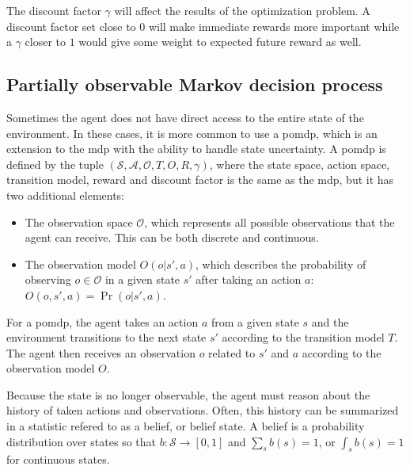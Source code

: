 The discount factor $\gamma$ will affect the results of the optimization problem. A discount factor set close to $0$ will make immediate rewards more important while a $\gamma$ closer to $1$ would give some weight to expected future reward as well. 

\subsection{Partially observable Markov decision process}\label{section:pomdp}
Sometimes the agent does not have direct access to the entire state of the environment. In these cases, it is more common to use a \gls{pomdp}, which is an extension to the \gls{mdp} with the ability to handle state uncertainty. A \gls{pomdp} is defined by the tuple $(\mathcal{S},\mathcal{A},\mathcal{O},T,O,R,\gamma)$, where the state space, action space, transition model, reward and discount factor is the same as the \gls{mdp}, but it has two additional elements: 
\begin{itemize}
    \item The observation space $\mathcal{O}$, which represents all possible observations that the agent can receive. This can be both discrete and continuous.
    \item The observation model $O(o|s',a)$, which describes the probability of observing $o \in \mathcal{O}$ in a given state $s'$ after taking an action $a$: $O(o,s',a)=\Pr(o|s',a)$.
\end{itemize}

For a \gls{pomdp}, the agent takes an action $a$ from a given state $s$ and the environment transitions to the next state $s'$ according to the transition model $T$. The agent then receives an observation $o$ related to $s'$ and $a$ according to the observation model $O$. 

Because the state is no longer observable, the agent must reason about the history of taken actions and observations. Often, this history can be summarized in a statistic refered to as a belief, or belief state. A belief is a probability distribution over states so that $b: \mathcal{S} \rightarrow [0,1]$ and $\sum_{s} b(s)=1$, or $\int_{s} b(s)=1$ for continuous states. 


